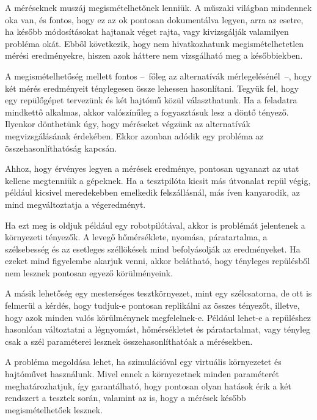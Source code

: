         A méréseknek muszáj megismételhetőnek lenniük. A műszaki világban mindennek oka van, és fontos, hogy ez az ok pontosan dokumentálva legyen, arra az esetre, ha később módosításokat hajtanak véget rajta, vagy kivizsgálják valamilyen probléma okát.
        Ebből következik, hogy nem hivatkozhatunk megismételhetetlen mérési eredményekre, hiszen azok háttere nem vizsgálható meg a későbbiekben.
        
        A megismételhetőség mellett fontos --~főleg az alternatívák mérlegelésénél~--, hogy két mérés eredményeit ténylegesen össze lehessen hasonlítani. Tegyük fel, hogy egy repülőgépet tervezünk és két hajtómű közül választhatunk. Ha a feladatra mindkettő alkalmas, akkor valószínűleg a fogyasztásuk lesz a döntő tényező. Ilyenkor dönthetünk úgy, hogy méréseket végzünk az alternatívák megvizsgálásának érdekében.
        Ekkor azonban adódik egy probléma az összehasonlíthatóság kapcsán.
        
        Ahhoz, hogy érvényes legyen a mérések eredménye, pontosan ugyanazt az utat kellene megtenniük a gépeknek. Ha a tesztpilóta kicsit más útvonalat repül végig, például kicsivel meredekebben emelkedik felszállásnál, más íven kanyarodik, az mind megváltoztatja a végeredményt.
        
        Ha ezt meg is oldjuk például egy robotpilótával, akkor is problémát jelentenek a környezeti tényezők. A levegő hőmérséklete, nyomása, páratartalma, a szélsebesség és az esetleges széllökések mind befolyásolják az eredményeket.
        Ha ezeket mind figyelembe akarjuk venni, akkor belátható, hogy tényleges repülésből nem lesznek pontosan egyező körülményeink.
        
        A másik lehetőség egy mesterséges tesztkörnyezet, mint egy szélcsatorna, de ott is felmerül a kérdés, hogy tudjuk-e pontosan replikálni az összes tényezőt, illetve, hogy azok minden valós körülménynek megfelelnek-e. Például lehet-e a repüléshez hasonlóan változtatni a légnyomást, hőmérsékletet és páratartalmat, vagy tényleg csak a szél paraméterei lesznek összehasonlíthatóak a mérésekben.
        
        A probléma megoldása lehet, ha szimulációval egy virtuális környezetet és hajtóművet használunk. Mivel ennek a környezetnek minden paraméterét meghatározhatjuk, így garantálható, hogy pontosan olyan hatások érik a két rendszert a tesztek során, valamint az is, hogy a mérések később megismételhetőek lesznek.

